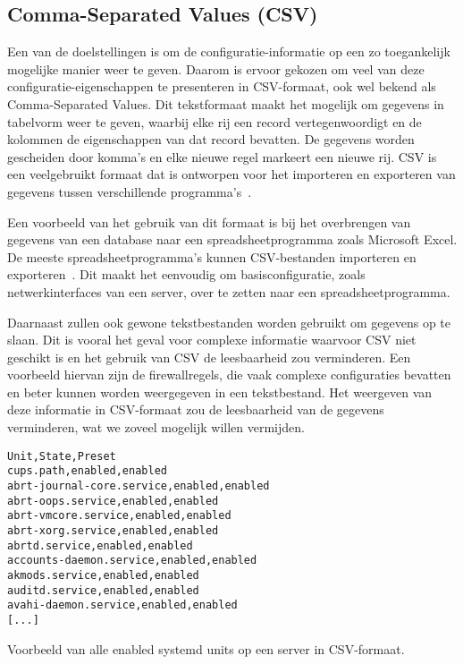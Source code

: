 \subsection{Comma-Separated Values (CSV)}
\label{poc_functionaliteiten_csv}

Een van de doelstellingen is om de configuratie-informatie op een zo toegankelijk mogelijke manier weer te geven.
Daarom is ervoor gekozen om veel van deze configuratie-eigenschappen te presenteren in CSV-formaat, ook wel bekend als Comma-Separated Values.
Dit tekstformaat maakt het mogelijk om gegevens in tabelvorm weer te geven, waarbij elke rij een record vertegenwoordigt en de kolommen de eigenschappen van dat record bevatten.
De gegevens worden gescheiden door komma's en elke nieuwe regel markeert een nieuwe rij.
CSV is een veelgebruikt formaat dat is ontworpen voor het importeren en exporteren van gegevens tussen verschillende programma's~\autocite{wikipedia2024csv}.

Een voorbeeld van het gebruik van dit formaat is bij het overbrengen van gegevens van een database naar een spreadsheetprogramma zoals Microsoft Excel.
De meeste spreadsheetprogramma's kunnen CSV-bestanden importeren en exporteren~\autocite{wikipedia2024csv}.
Dit maakt het eenvoudig om basisconfiguratie, zoals netwerkinterfaces van een server, over te zetten naar een spreadsheetprogramma.

Daarnaast zullen ook gewone tekstbestanden worden gebruikt om gegevens op te slaan.
Dit is vooral het geval voor complexe informatie waarvoor CSV niet geschikt is en het gebruik van CSV de leesbaarheid zou verminderen.
Een voorbeeld hiervan zijn de firewallregels, die vaak complexe configuraties bevatten en beter kunnen worden weergegeven in een tekstbestand.
Het weergeven van deze informatie in CSV-formaat zou de leesbaarheid van de gegevens verminderen, wat we zoveel mogelijk willen vermijden.

\begin{listing}
  \begin{verbatim}
Unit,State,Preset
cups.path,enabled,enabled
abrt-journal-core.service,enabled,enabled
abrt-oops.service,enabled,enabled
abrt-vmcore.service,enabled,enabled
abrt-xorg.service,enabled,enabled
abrtd.service,enabled,enabled
accounts-daemon.service,enabled,enabled
akmods.service,enabled,enabled
auditd.service,enabled,enabled
avahi-daemon.service,enabled,enabled
[...]
  \end{verbatim}
  \caption[Enabled systemd units in CSV-formaat.]{Voorbeeld van alle enabled systemd units op een server in CSV-formaat.}
  \label{lst:poc-network-csv}
\end{listing}

